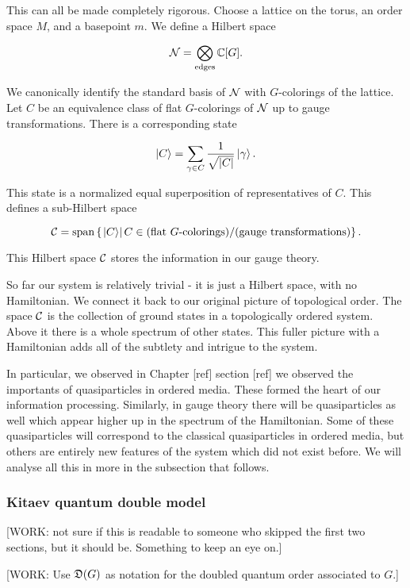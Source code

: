 This can all be made completely rigorous. Choose a lattice on the torus, an order space $M$, and a basepoint $m$. We define a Hilbert space

$$\mathcal{N}=\bigotimes_{\text{edges}}\mathbb{C}[G].$$

We canonically identify the standard basis of $\mathcal{N}$ with $G$-colorings of the lattice. Let $C$ be an equivalence class of flat $G$-colorings of $\mathcal{N}$ up to gauge transformations. There is a corresponding state

$$\ket{C}=\sum_{\gamma \in C}\frac{1}{\sqrt{|C|}}\ket{\gamma}.$$

This state is a normalized equal superposition of representatives of $C$. This defines a sub-Hilbert space

$$\mathcal{C}=\text{span}\left\{\left.\ket{C}\right| C\in \text{(flat $G$-colorings)}/\text{(gauge transformations)}\right\}.$$

This Hilbert space $\mathcal{C}$ stores the information in our gauge theory.

So far our system is relatively trivial - it is just a Hilbert space, with no Hamiltonian. We connect it back to our original picture of topological order. The space $\mathcal{C}$ is the collection of ground states in a topologically ordered system. Above it there is a whole spectrum of other states. This fuller picture with a Hamiltonian adds all of the subtlety and intrigue to the system.

In particular, we observed in Chapter [ref] section [ref] we observed the importants of quasiparticles in ordered media. These formed the heart of our information processing. Similarly, in gauge theory there will be quasiparticles as well which appear higher up in the spectrum of the Hamiltonian. Some of these quasiparticles will correspond to the classical quasiparticles in ordered media, but others are entirely new features of the system which did not exist before. We will analyse all this in more in the subsection that follows.

\subsubsection{Kitaev quantum double model}

[WORK: not sure if this is readable to someone who skipped the first two sections, but it should be. Something to keep an eye on.]

[WORK: Use $\mathfrak{D}(G)$ as notation for the doubled quantum order associated to $G$.]

